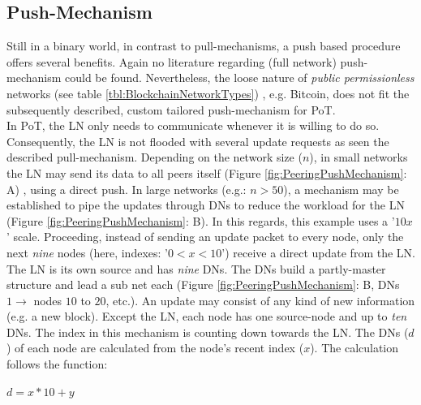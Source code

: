 \subsection{Push-Mechanism} \label{def:PushMechanism}
Still in a binary world, in contrast to pull-mechanisms, a push based procedure offers several benefits.
Again no literature regarding (full network) push-mechanism could be found.
Nevertheless, the loose nature of \textit{public permissionless} networks (see table \ref{tbl:BlockchainNetworkTypes})
, e.g. Bitcoin, does not fit the subsequently described, custom tailored push-mechanism for \gls{PoT}. \\
In \gls{PoT}, the \gls{LN} only needs to communicate whenever it is willing to do so.
Consequently, the \gls{LN} is not flooded with several update requests as seen the described pull-mechanism.
Depending on the network size ($n$), in small networks the \gls{LN} may send its data to all peers itself (Figure \ref{fig:PeeringPushMechanism}: A) , using a direct push.
In large networks (e.g.: $n>50$), a mechanism may be established to pipe the updates through \gls{DNs} to reduce the workload for the \gls{LN} (Figure \ref{fig:PeeringPushMechanism}: B).
In this regards, this example uses a '$10x$' scale.
Proceeding, instead of sending an update packet to every node,
only the next \textit{nine} nodes (here, indexes: '$0<x<10$') receive a direct update from the \gls{LN}.
The \gls{LN} is its own source and has \textit{nine} \gls{DNs}.
The \gls{DNs} build a partly-master structure and lead a sub net each (Figure \ref{fig:PeeringPushMechanism}: B, \gls{DNs} $1 \to $ nodes $10$ to $20 $, etc.).
An update may consist of any kind of new information (e.g. a new block).
Except the \gls{LN}, each node has one source-node and up to \textit{ten} \gls{DNs}.
The index in this mechanism is counting down towards the \gls{LN}.
The \gls{DNs} ($d$) of each node are calculated from the node's recent index ($x$).
The calculation follows the function:
\begin{center}
	$d = x*10+y$
\end{center}

